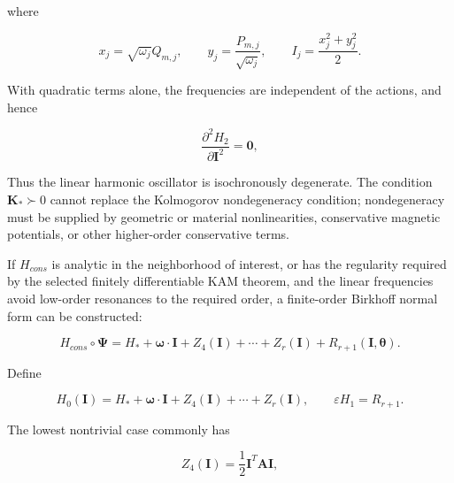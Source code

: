 where

\begin{equation}
\label{eq:hamiltonian-3-81}
x_{j} = \sqrt{\omega_{j}}Q_{m,j},\quad\quad y_{j} = \frac{P_{m,j}}{\sqrt{\omega_{j}}},\quad\quad I_{j} = \frac{x_{j}^{2} + y_{j}^{2}}{2}.
\end{equation}

With quadratic terms alone, the frequencies are independent of the actions, and hence

\begin{equation}
\label{eq:hamiltonian-3-82}
\frac{\partial^{2}H_{2}}{\partial\mathbf{I}^{2}} = \mathbf{0},
\end{equation}

Thus the linear harmonic oscillator is isochronously degenerate. The condition \(\mathbf{K}_{*} \succ 0\) cannot replace the Kolmogorov nondegeneracy condition; nondegeneracy must be supplied by geometric or material nonlinearities, conservative magnetic potentials, or other higher-order conservative terms.

If \(H_{cons}\) is analytic in the neighborhood of interest, or has the regularity required by the selected finitely differentiable KAM theorem, and the linear frequencies avoid low-order resonances to the required order, a finite-order Birkhoff normal form can be constructed:\cite{HairerLubichWanner2006GNI,FengQin2010,Arnold1989ClassicalMechanics}

\begin{equation}
\label{eq:hamiltonian-3-83}
H_{cons} \circ \bm{\Psi} = H_{*} + \bm{\omega} \cdot \mathbf{I} + Z_{4}\left( \mathbf{I} \right) + \cdots + Z_{r}\left( \mathbf{I} \right) + R_{r + 1}\left( \mathbf{I},\bm{\theta} \right).
\end{equation}

Define

\begin{equation}
\label{eq:hamiltonian-3-84}
\boxed{H_{0}\left( \mathbf{I} \right) = H_{*} + \bm{\omega} \cdot \mathbf{I} + Z_{4}\left( \mathbf{I} \right) + \cdots + Z_{r}\left( \mathbf{I} \right),\quad\quad\varepsilon H_{1} = R_{r + 1}.}
\end{equation}

The lowest nontrivial case commonly has

\begin{equation}
\label{eq:hamiltonian-3-85}
Z_{4}\left( \mathbf{I} \right) = \frac{1}{2}\mathbf{I}^{T}\mathbf{A}\mathbf{I},
\end{equation}

